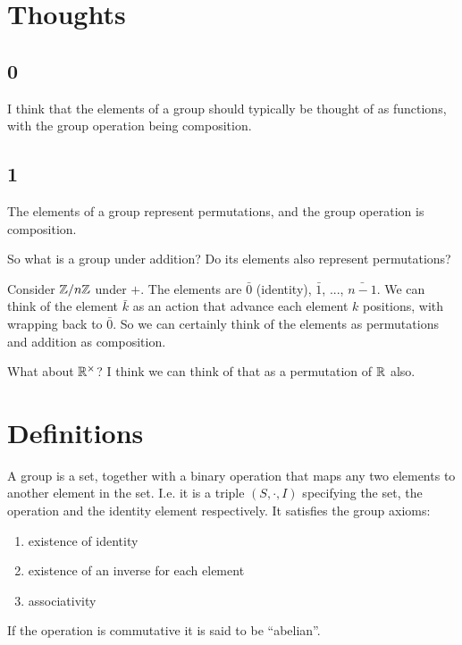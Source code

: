 \newcommand{\alphainv}{\alpha^{-1}}

\section{Thoughts}

\subsection{0}

I think that the elements of a group should typically be thought of as functions, with the group operation
being composition.




\subsection{1}
The elements of a group represent permutations, and the group operation is composition.

So what is a group under addition? Do its elements also represent permutations?

Consider $\mathbb{Z}/n\mathbb{Z}$ under $+$. The elements are $\bar 0$ (identity), $\bar 1$, ..., $\bar{n - 1}$. We can think
of the element $\bar k$ as an action that advance each element $k$ positions, with wrapping back to $\bar 0$.
So we can certainly think of the elements as permutations and addition as composition.

What about $\mathbb{R}^\times$? I think we can think of that as a permutation of $\mathbb{R}$ also.



\section{Definitions}

\begin{definition*}[Group]
  A group is a set, together with a binary operation that maps any two elements
  to another element in the set. I.e. it is a triple $(S, \cdot, I)$ specifying
  the set, the operation and the identity element respectively. It satisfies the
  group axioms:
  \begin{enumerate}
  \item existence of identity
  \item existence of an inverse for each element
  \item associativity
  \end{enumerate}
  If the operation is commutative it is said to be ``abelian''.
\end{definition*}

